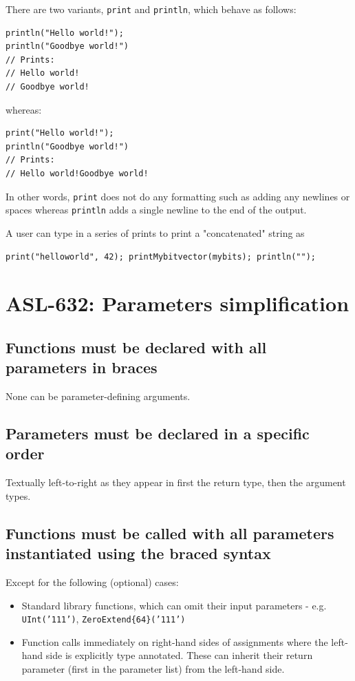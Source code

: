 There are two variants, \texttt{print} and \texttt{println}, which behave
as follows:
\begin{verbatim}
println("Hello world!");
println("Goodbye world!")
// Prints:
// Hello world!
// Goodbye world!
\end{verbatim}

whereas:
\begin{verbatim}
print("Hello world!");
println("Goodbye world!")
// Prints:
// Hello world!Goodbye world!
\end{verbatim}

In other words, \texttt{print} does not do any formatting such as adding any
newlines or spaces whereas \texttt{println} adds a single newline to the end of
the output.

A user can type in a series of prints to print a "concatenated" string as

\begin{verbatim}
print("helloworld", 42); printMybitvector(mybits); println(""); 
\end{verbatim}

\section{ASL-632: Parameters simplification}

\subsection{Functions must be declared with all parameters in braces}
None can be parameter-defining arguments. 

\subsection{Parameters must be declared in a specific order} 

Textually left-to-right as they appear in first the return type, then the
argument types.

\subsection{Functions must be called with all parameters instantiated using the braced syntax} 
Except for the following (optional) cases:
\begin{itemize}
\item Standard library functions, which can omit their input parameters -
e.g. \texttt{UInt('111')}, \texttt{ZeroExtend\{64\}('111')}
\item Function calls immediately on right-hand sides of assignments where
the left-hand side is explicitly type annotated. These can inherit their
return parameter (first in the parameter list) from the left-hand side.
\end{itemize}

